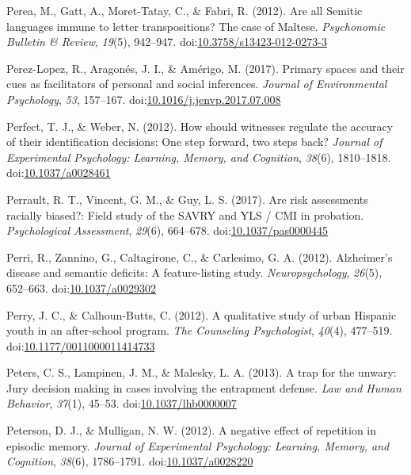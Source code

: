 \documentclass[english,man]{apa6}
\begin{document}
\hypertarget{ref-Perea2012}{}
Perea, M., Gatt, A., Moret-Tatay, C., \& Fabri, R. (2012). Are all
Semitic languages immune to letter transpositions? The case of Maltese.
\emph{Psychonomic Bulletin \& Review}, \emph{19}(5), 942--947.
doi:\href{https://doi.org/10.3758/s13423-012-0273-3}{10.3758/s13423-012-0273-3}

\hypertarget{ref-Perez-Lopez2017}{}
Perez-Lopez, R., Aragonés, J. I., \& Amérigo, M. (2017). Primary spaces
and their cues as facilitators of personal and social inferences.
\emph{Journal of Environmental Psychology}, \emph{53}, 157--167.
doi:\href{https://doi.org/10.1016/j.jenvp.2017.07.008}{10.1016/j.jenvp.2017.07.008}

\hypertarget{ref-Perfect2012}{}
Perfect, T. J., \& Weber, N. (2012). How should witnesses regulate the
accuracy of their identification decisions: One step forward, two steps
back? \emph{Journal of Experimental Psychology: Learning, Memory, and
Cognition}, \emph{38}(6), 1810--1818.
doi:\href{https://doi.org/10.1037/a0028461}{10.1037/a0028461}

\hypertarget{ref-Perrault2017}{}
Perrault, R. T., Vincent, G. M., \& Guy, L. S. (2017). Are risk
assessments racially biased?: Field study of the SAVRY and YLS / CMI in
probation. \emph{Psychological Assessment}, \emph{29}(6), 664--678.
doi:\href{https://doi.org/10.1037/pas0000445}{10.1037/pas0000445}

\hypertarget{ref-Perri2012}{}
Perri, R., Zannino, G., Caltagirone, C., \& Carlesimo, G. A. (2012).
Alzheimer's disease and semantic deficits: A feature-listing study.
\emph{Neuropsychology}, \emph{26}(5), 652--663.
doi:\href{https://doi.org/10.1037/a0029302}{10.1037/a0029302}

\hypertarget{ref-Perry2012}{}
Perry, J. C., \& Calhoun-Butts, C. (2012). A qualitative study of urban
Hispanic youth in an after-school program. \emph{The Counseling
Psychologist}, \emph{40}(4), 477--519.
doi:\href{https://doi.org/10.1177/0011000011414733}{10.1177/0011000011414733}

\hypertarget{ref-Peters2013}{}
Peters, C. S., Lampinen, J. M., \& Malesky, L. A. (2013). A trap for the
unwary: Jury decision making in cases involving the entrapment defense.
\emph{Law and Human Behavior}, \emph{37}(1), 45--53.
doi:\href{https://doi.org/10.1037/lhb0000007}{10.1037/lhb0000007}

\hypertarget{ref-Peterson2012}{}
Peterson, D. J., \& Mulligan, N. W. (2012). A negative effect of
repetition in episodic memory. \emph{Journal of Experimental Psychology:
Learning, Memory, and Cognition}, \emph{38}(6), 1786--1791.
doi:\href{https://doi.org/10.1037/a0028220}{10.1037/a0028220}
\end{document}
